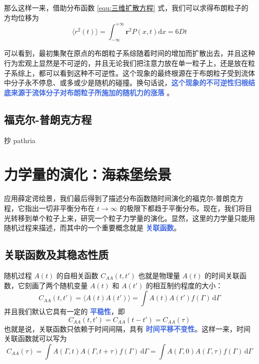 那么这样一来，借助分布函数 \eqref{equ:三维扩散方程} 式，我们可以求得布朗粒子的方均位移为
\begin{equation}\label{equ:布朗粒子的方均位移}
    \langle r^2(t) \rangle = \int_{-\infty}^{+\infty} \bm r^2 P(x,t)\mathrm{d}x = 6Dt
\end{equation}

可以看到，最初集聚在原点的布朗粒子系综随着时间的增加而扩散出去，并且这种行为宏观上显然是不可逆的，并且无论我们把注意力放在单一粒子上，还是放在粒子系综上，都可以看到这种不可逆性。这个现象的最终根源在于布朗粒子受到流体中分子永不停息、或多或少是随机的碰撞。换句话说，\textcolor{RoyalBlue}{\textbf{\kaishu  这个现象的不可逆性归根结底来源于流体分子对布朗粒子所施加的随机力的涨落}} 。

\subsection{福克尔-普朗克方程}\label{subsec:福克尔-普朗克方程}

抄 pathria

\section{力学量的演化：海森堡绘景}\label{sec:力学量的演化：海森堡绘景}

应用薛定谔绘景，我们最后得到了描述分布函数随时间演化的福克尔-普朗克方程，它指出一切非平衡分布在 $t\rightarrow \infty$ 的极限下都趋于平衡分布。现在，我们将目光转移到单个粒子上来，研究一个粒子力学量的演化。显然，这里的力学量只能用随机过程来描述，而其中的一个重要概念就是 \textcolor{RoyalBlue}{\textbf{\kaishu 关联函数}}。

\subsection{关联函数及其稳态性质}\label{subsec:关联函数及其稳态性质}

随机过程 $A(t)$ 的自相关函数 $C_{AA}(t,t')$ 也就是物理量 $A(t)$ 的时间关联函数，它刻画了两个随机变量 $A(t)$ 和 $A(t')$ 的相互制约程度的大小：
\begin{equation}\label{equ:时间关联函数}
    C_{AA}(t,t') = \langle A(t)A(t') \rangle = \int A(t)A(t') f(\Gamma) \,\mathrm{d}\Gamma
\end{equation}
并且我们默认它具有一定的 \textcolor{RoyalBlue}{\textbf{\kaishu  平稳性}}，即
\begin{equation}\label{equ:关联函数的平稳性}
    C_{AA}(t,t') = C_{AA}(t-t') = C_{AA}(\tau)
\end{equation}
也就是说，关联函数只依赖于时间间隔，具有 \textcolor{RoyalBlue}{\textbf{\kaishu 时间平移不变性}}。这样一来，时间关联函数就可以写为
\begin{equation}\label{equ:时间关联函数的形式}
    C_{AA}(\tau) = \int A(\Gamma,t)A(\Gamma,t+\tau)f(\Gamma) \,\mathrm{d}\Gamma = \int A(\Gamma,0)A(\Gamma,\tau) f(\Gamma)\,\mathrm{d}\Gamma
\end{equation}

